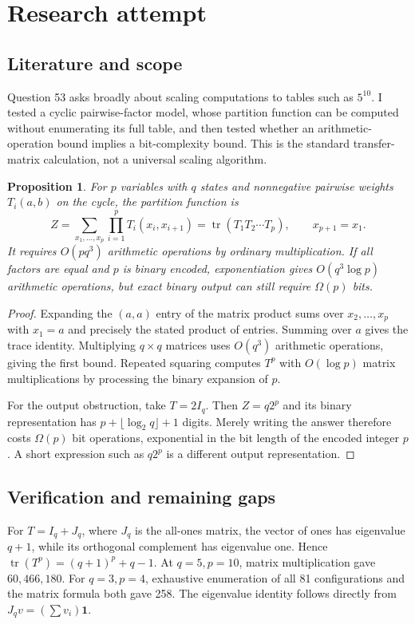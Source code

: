 \documentclass[11pt]{article}
\newtheorem{proposition}{Proposition}
\begin{document}
\section{Research attempt}
\subsection{Literature and scope}
Question 53 asks broadly about scaling computations to tables such as $5^{10}$. I tested a cyclic pairwise-factor model, whose partition function can be computed without enumerating its full table, and then tested whether an arithmetic-operation bound implies a bit-complexity bound. This is the standard transfer-matrix calculation, not a universal scaling algorithm.
\begin{proposition}
For $p$ variables with $q$ states and nonnegative pairwise weights $T_i(a,b)$ on the cycle, the partition function is
\[
Z=\sum_{x_1,\ldots,x_p}\prod_{i=1}^pT_i(x_i,x_{i+1})
=\operatorname{tr}(T_1T_2\cdots T_p),\qquad x_{p+1}=x_1.
\]
It requires $O(pq^3)$ arithmetic operations by ordinary multiplication. If all factors are equal and $p$ is binary encoded, exponentiation gives $O(q^3\log p)$ arithmetic operations, but exact binary output can still require $\Omega(p)$ bits.
\end{proposition}
\begin{proof}
Expanding the $(a,a)$ entry of the matrix product sums over $x_2,\ldots,x_p$ with $x_1=a$ and precisely the stated product of entries. Summing over $a$ gives the trace identity. Multiplying $q\times q$ matrices uses $O(q^3)$ arithmetic operations, giving the first bound. Repeated squaring computes $T^p$ with $O(\log p)$ matrix multiplications by processing the binary expansion of $p$.

For the output obstruction, take $T=2I_q$. Then $Z=q2^p$ and its binary representation has $p+\lfloor\log_2q\rfloor+1$ digits. Merely writing the answer therefore costs $\Omega(p)$ bit operations, exponential in the bit length of the encoded integer $p$. A short expression such as $q2^p$ is a different output representation.
\end{proof}
\subsection{Verification and remaining gaps}
For $T=I_q+J_q$, where $J_q$ is the all-ones matrix, the vector of ones has eigenvalue $q+1$, while its orthogonal complement has eigenvalue one. Hence $\operatorname{tr}(T^p)=(q+1)^p+q-1$. At $q=5,p=10$, matrix multiplication gave $60{,}466{,}180$. For $q=3,p=4$, exhaustive enumeration of all 81 configurations and the matrix formula both gave 258. The eigenvalue identity follows directly from $J_qv=(\sum v_i)\mathbf1$.
\end{document}
